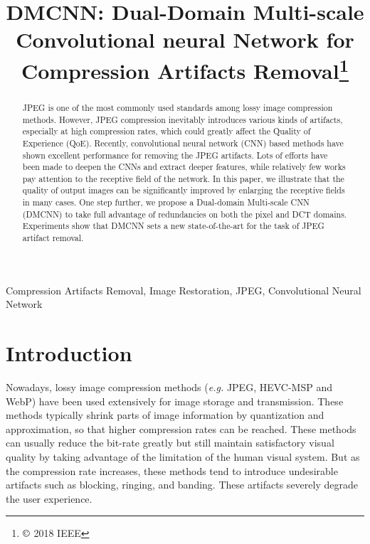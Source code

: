 \documentclass{article}
\title{DMCNN: Dual-Domain Multi-scale Convolutional neural Network 
for Compression Artifacts Removal\thanks{$\copyright$ 2018 IEEE}}
\begin{document}
\maketitle
\vspace{-0.2cm}
\begin{abstract}
JPEG is one of the most commonly used standards among lossy image compression
methods. However, JPEG compression inevitably introduces various kinds of
artifacts, especially at high compression rates, which could greatly affect
the Quality of Experience (QoE). Recently, convolutional neural network (CNN)
based methods have shown excellent performance for removing the JPEG artifacts.
Lots of efforts have been made to deepen the CNNs and extract deeper features,
while relatively few works pay attention to the receptive field of the network.
In this paper, we illustrate that the quality of output images can be
significantly improved by enlarging the receptive fields in many cases.
One step further, we propose a Dual-domain Multi-scale CNN (DMCNN) to
take full advantage of redundancies on both the pixel and DCT domains.
Experiments show that DMCNN sets a new state-of-the-art for the task of
JPEG artifact removal.
\end{abstract}
\begin{keywords}
Compression Artifacts Removal, Image Restoration, JPEG, Convolutional Neural
Network
\end{keywords}
\vspace{-0.2cm}
\section{Introduction}
\label{sec:intro}
Nowadays, lossy image compression methods (\textit{e.g.} JPEG, HEVC-MSP and WebP)
have been used extensively for image storage and transmission.
These methods typically shrink parts of image information by quantization
and approximation, so that higher compression rates can be reached. These
methods can usually reduce the bit-rate greatly but still maintain satisfactory
visual quality by taking advantage of the limitation of the
human visual system. But as the compression rate increases, these methods
tend to introduce undesirable artifacts such as
blocking, ringing, and banding. These artifacts severely degrade
the user experience.
\end{document}

